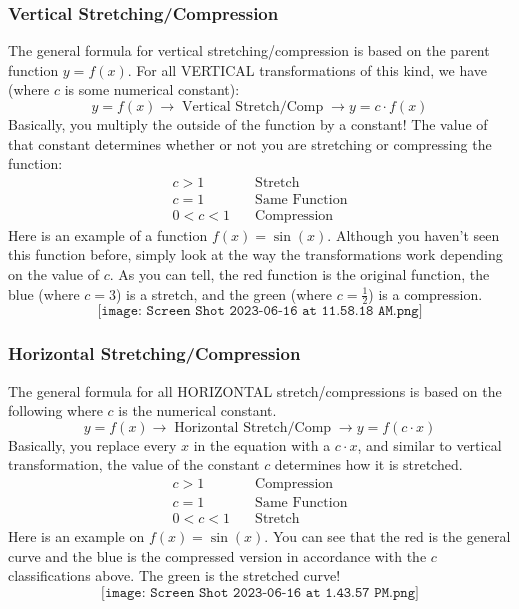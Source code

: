 \subsubsection{Vertical Stretching/Compression}
The general formula for vertical stretching/compression is based on the parent function $y = f(x)$. For all VERTICAL transformations of this kind, we have (where $c$ is some numerical constant):
$$
y = f(x) \longrightarrow \;\text{Vertical Stretch/Comp}\;\longrightarrow y = c\cdot f(x)
$$
Basically, you multiply the outside of the function by a constant! The value of that constant determines whether or not you are stretching or compressing the function:
\begin{align*}
    c > 1 & \quad \text{Stretch} \\
    c = 1 & \quad \text{Same Function}\\
    0 < c < 1 & \quad \text{Compression} 
\end{align*}
Here is an example of a function $f(x) = \sin(x)$. Although you haven't seen this function before, simply look at the way the transformations work depending on the value of $c$. As you can tell, the red function is the original function, the blue (where $c = 3$) is a stretch, and the green (where $c = \frac{1}{2}$) is a compression.
$$
\texttt{[image: Screen Shot 2023-06-16 at 11.58.18 AM.png]}
$$
\subsubsection{Horizontal Stretching/Compression}
The general formula for all HORIZONTAL stretch/compressions is based on the following where $c$ is the numerical constant.
$$
y = f(x) \longrightarrow \;\text{Horizontal Stretch/Comp}\; \longrightarrow y = f(c \cdot x)
$$
Basically, you replace every $x$ in the equation with a $c \cdot x$, and similar to vertical transformation, the value of the constant $c$ determines how it is stretched.
\begin{align*}
    c > 1 & \quad \text{Compression} \\
    c = 1 & \quad \text{Same Function}\\
    0 < c < 1 & \quad \text{Stretch}
\end{align*}
Here is an example on $f(x) = \sin(x)$. You can see that the red is the general curve and the blue is the compressed version in accordance with the $c$ classifications above. The green is the stretched curve!
$$
\texttt{[image: Screen Shot 2023-06-16 at 1.43.57 PM.png]}
$$
